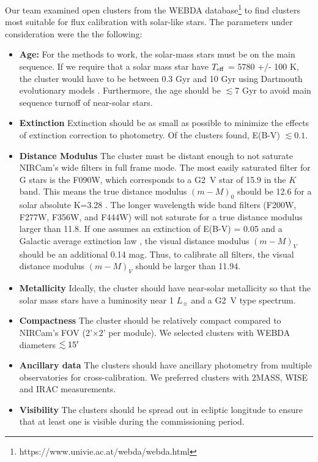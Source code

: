 \documentclass{aastex6}
\begin{document}
Our team examined open clusters from the WEBDA database\footnote{https://www.univie.ac.at/webda/webda.html} to find clusters most suitable for flux calibration with solar-like stars.
The parameters under consideration were the the following:
\begin{itemize}
\item {\bf Age:} For the methods to work, the solar-mass stars must be on the main sequence. If we require that a solar mass star have $T_{\rm eff}$ = 5780 +/- 100 K, the cluster would have to be between 0.3 Gyr and 10 Gyr using Dartmouth evolutionary models \citep{dotter2008dartmouth}. Furthermore, the age should be $\lesssim$7 Gyr to avoid main sequence turnoff of near-solar stars.
\item {\bf Extinction} Extinction should be as small as possible to minimize the effects of extinction correction to photometry. Of the clusters found, E(B-V) $\lesssim 0.1$.
\item {\bf Distance Modulus} The cluster must be distant enough to not saturate NIRCam's wide filters in full frame mode. The most easily saturated filter for G stars is the F090W, which corresponds to a G2~V star of 15.9 in the $K$ band. This means the true distance modulus $(m - M)_0$ should be 12.6 for a solar absolute K=3.28 \citep{binney1998book}.
The longer wavelength wide band filters (F200W, F277W, F356W, and F444W) will not saturate for a true distance modulus larger than 11.8.
If one assumes an extinction of E(B-V) = 0.05 and a Galactic average extinction law \citep{cardelli1989}, the visual distance modulus $(m- M)_V$ should be an additional 0.14 mag.
Thus, to calibrate all filters, the visual distance modulus $(m- M)_V$ should be larger than 11.94.
\item {\bf Metallicity} Ideally, the cluster should have near-solar metallicity so that the solar mass stars have a luminosity near 1 $L_\sun$ and a G2~V type spectrum.
\item {\bf Compactness} The cluster should be relatively compact compared to NIRCam's FOV (2'$\times$2' per module).
We selected clusters with WEBDA diameters $\lesssim 15\mbox{$^\prime$}$
\item {\bf Ancillary data} The clusters should have ancillary photometry from multiple observatories for cross-calibration. We preferred clusters with 2MASS, WISE and IRAC measurements.
\item {\bf Visibility} The clusters should be spread out in ecliptic longitude to ensure that at least one is visible during the commissioning period.
\end{itemize}
\end{document}
